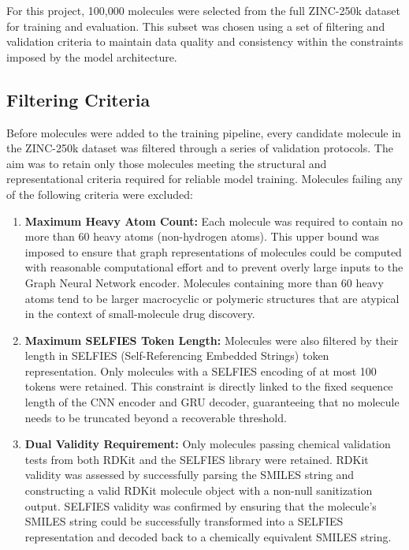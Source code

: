 \documentclass[12pt,a4paper]{report}
\begin{document}
For this project, 100,000 molecules were selected from the full ZINC-250k dataset for training and evaluation. This subset was chosen using a set of filtering and validation criteria to maintain data quality and consistency within the constraints imposed by the model architecture.

\subsection{Filtering Criteria}

Before molecules were added to the training pipeline, every candidate molecule in the ZINC-250k dataset was filtered through a series of validation protocols. The aim was to retain only those molecules meeting the structural and representational criteria required for reliable model training. Molecules failing any of the following criteria were excluded:

\begin{enumerate}
    \item \textbf{Maximum Heavy Atom Count:} Each molecule was required to contain no more than 60 heavy atoms (non-hydrogen atoms). This upper bound was imposed to ensure that graph representations of molecules could be computed with reasonable computational effort and to prevent overly large inputs to the Graph Neural Network encoder. Molecules containing more than 60 heavy atoms tend to be larger macrocyclic or polymeric structures that are atypical in the context of small-molecule drug discovery.
    \item \textbf{Maximum SELFIES Token Length:} Molecules were also filtered by their length in SELFIES (Self-Referencing Embedded Strings) token representation. Only molecules with a SELFIES encoding of at most 100 tokens were retained. This constraint is directly linked to the fixed sequence length of the CNN encoder and GRU decoder, guaranteeing that no molecule needs to be truncated beyond a recoverable threshold. 
    \item \textbf{Dual Validity Requirement:} Only molecules passing chemical validation tests from both RDKit and the SELFIES library were retained. RDKit validity was assessed by successfully parsing the SMILES string and constructing a valid RDKit molecule object with a non-null sanitization output. SELFIES validity was confirmed by ensuring that the molecule's SMILES string could be successfully transformed into a SELFIES representation and decoded back to a chemically equivalent SMILES string.
\end{enumerate}
\end{document}
